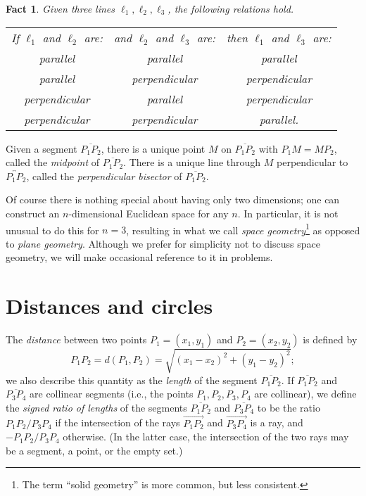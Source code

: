 \documentclass[12pt]{book}
\numberwithin{exc}{section}
\numberwithin{figure}{section}
\newtheorem{fact}[theorem]{Fact}
\numberwithin{equation}{theorem}
\def\line#1{\overleftrightarrow{#1}}
\def\ray#1{\overrightarrow{#1}}
\def\seg#1{\overline{#1}}
\begin{document}
\begin{fact}
Given three lines $\ell_1, \ell_2, \ell_3$, the following relations hold.
\begin{center}
\begin{tabular}{ccc}
If $\ell_1$ and $\ell_2$ are: &
and $\ell_2$ and $\ell_3$ are: &
then $\ell_1$ and $\ell_3$ are: \\
parallel & parallel & parallel \\
parallel & perpendicular & perpendicular \\
perpendicular & parallel & perpendicular \\
perpendicular & perpendicular & parallel.
\end{tabular}
\end{center}
\end{fact}

Given a segment $\seg{P_1P_2}$, there is a unique
point $M$ on $\seg{P_1P_2}$ with $P_1M = MP_2$, called the
\emph{midpoint}  of
$\seg{P_1P_2}$. There is a unique line through $M$ perpendicular
to $\line{P_1P_2}$, called the \emph{perpendicular bisector}
of $\seg{P_1P_2}$.

Of course there is nothing special about having only two dimensions; one can
construct an $n$-dimensional Euclidean space for any $n$. In particular, it is not 
unusual to do this for $n=3$, resulting in what we call 
\emph{space geometry}\footnote{The term ``solid geometry''  
is more common, but less consistent.}  
as opposed to \emph{plane geometry}.
 
Although we prefer for simplicity not to discuss space geometry, we will make 
occasional reference to it in problems.

\section{Distances and circles}

The
\emph{distance} 
between two points $P_1 = (x_1, y_1)$ and $P_2 = 
(x_2, y_2)$ is defined
by
\[
P_1P_2 = d(P_1, P_2) = \sqrt{(x_1-x_2)^2 + (y_1 - y_2)^2};
\]
we also describe this quantity as the
\emph{length}  of the
segment $\seg{P_1P_2}$. If $\seg{P_1P_2}$ and $\seg{P_3P_4}$ are collinear segments (i.e., the points $P_1,P_2,P_3,P_4$ are collinear), we define the
\emph{signed ratio of lengths}
of the segments $\seg{P_1P_2}$
and $\seg{P_3P_4}$ to be the ratio $P_1P_2/P_3P_4$ if the intersection of 
the rays $\ray{P_1P_2}$ and $\ray{P_3P_4}$ is a ray, and $-P_1P_2/P_3P_4$ otherwise. (In the latter case, the intersection of the two rays may be
a segment, a point, or the empty set.)
\end{document}
